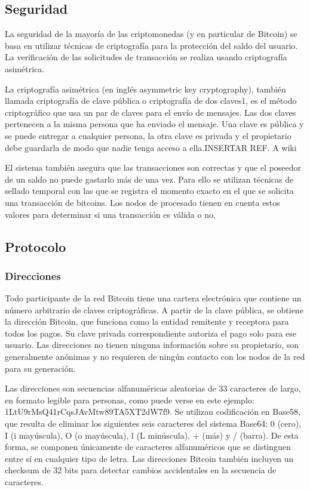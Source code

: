 \subsection{Seguridad}

La seguridad de la mayor\'ia de las criptomonedas (y en particular de Bitcoin) se basa en utilizar t\'ecnicas de criptograf\'ia para la protecci\'on del saldo del usuario. La verificaci\'on de las solicitudes de transacci\'on se realiza usando criptograf\'ia asim\'etrica.

La criptograf\'ia asim\'etrica (en ingl\'es asymmetric key cryptography), tambi\'en llamada criptograf\'ia de clave p\'ublica o criptograf\'ia de dos claves1, es el m\'etodo criptogr\'afico que usa un par de claves para el env\'io de mensajes. Las dos claves pertenecen a la misma persona que ha enviado el mensaje. Una clave es p\'ublica y se puede entregar a cualquier persona, la otra clave es privada y el propietario debe guardarla de modo que nadie tenga acceso a ella.INSERTAR REF. A wiki

El sistema tambi\'en asegura que las transacciones son correctas y que el poseedor de un saldo no puede gastarlo m\'as de una vez. Para ello se utilizan t\'ecnicas de sellado temporal con las que se registra el momento exacto en el que se solicita una transacci\'on de bitcoins. Los nodos de procesado tienen en cuenta estos valores para determinar si una transacci\'on es v\'alida o no.

\subsection{Protocolo}

\subsubsection{Direcciones}

Todo participante de la red Bitcoin tiene una cartera electr\'onica que contiene un n\'umero arbitrario de claves criptogr\'aficas. A partir de la clave p\'ublica, se obtiene la direcci\'on Bitcoin, que funciona como la entidad remitente y receptora para todos los pagos. Su clave privada correspondiente autoriza el pago solo para ese usuario. Las direcciones no tienen ninguna informaci\'on sobre su propietario, son generalmente an\'onimas y no requieren de ning\'un contacto con los nodos de la red para su generaci\'on.

Las direcciones son secuencias alfanum\'ericas aleatorias de 33 caracteres de largo, en formato legible para personas, como puede verse en este ejemplo: 1LtU9rMsQ41rCqsJAvMtw89TA5XT2dW7f9. Se utilizan codificaci\'on en Base58, que resulta de eliminar los siguientes seis caracteres del sistema Base64: 0 (cero), I (i may\'uscula), O (o may\'uscula), l (L min\'uscula), + (m\'as) y / (barra). De esta forma, se componen \'unicamente de caracteres alfanum\'ericos que se distinguen entre s\'i en cualquier tipo de letra. Las direcciones Bitcoin tambi\'en incluyen un checksum de 32 bits para detectar cambios accidentales en la secuencia de caracteres.

